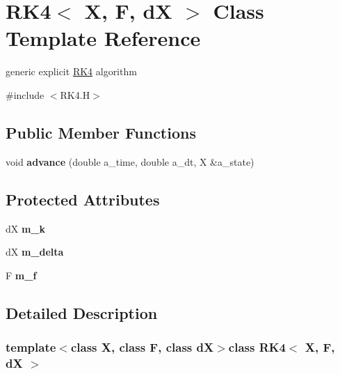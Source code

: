 \hypertarget{classRK4}{}\section{R\+K4$<$ X, F, d\+X $>$ Class Template Reference}
\label{classRK4}


generic explicit \hyperlink{classRK4}{R\+K4} algorithm  




{\ttfamily \#include $<$R\+K4.\+H$>$}

\subsection*{Public Member Functions}
\begin{DoxyCompactItemize}
\item 
\hypertarget{classRK4_af0486f7e162b0a935b390bb7fc1a9f02}{}void {\bfseries advance} (double a\+\_\+time, double a\+\_\+dt, X \&a\+\_\+state)\label{classRK4_af0486f7e162b0a935b390bb7fc1a9f02}

\end{DoxyCompactItemize}
\subsection*{Protected Attributes}
\begin{DoxyCompactItemize}
\item 
\hypertarget{classRK4_a92f523886ca69913832d9efae83579ac}{}d\+X {\bfseries m\+\_\+k}\label{classRK4_a92f523886ca69913832d9efae83579ac}

\item 
\hypertarget{classRK4_ab79f59c90025ff0f04fa3391fd0a6e4b}{}d\+X {\bfseries m\+\_\+delta}\label{classRK4_ab79f59c90025ff0f04fa3391fd0a6e4b}

\item 
\hypertarget{classRK4_a8708d55158344f113a14ec23fec25a91}{}F {\bfseries m\+\_\+f}\label{classRK4_a8708d55158344f113a14ec23fec25a91}

\end{DoxyCompactItemize}


\subsection{Detailed Description}
\subsubsection*{template$<$class X, class F, class d\+X$>$class R\+K4$<$ X, F, d\+X $>$}

